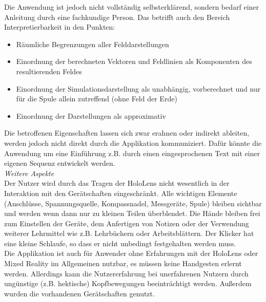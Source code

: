 Die Anwendung ist jedoch nicht vollständig selbsterklärend, sondern bedarf einer Anleitung durch eine fachkundige Person. Das betrifft auch den Bereich Interpretierbarkeit in den Punkten:
\begin{itemize}
	\setlength{\itemsep}{-1pt}
	\singlespacing
	\item Räumliche Begrenzungen aller Felddarstellungen
	\item Einordnung der berechneten Vektoren und Feldlinien als Komponenten des resultierenden Feldes
	\item Einordnung der Simulationsdarstellung als unabhängig, vorberechnet und nur für die Spule allein zutreffend (ohne Feld der Erde)
	\item Einordnung der Darstellungen als approximativ
\end{itemize}

Die betroffenen Eigenschaften lassen sich zwar erahnen oder indirekt ableiten, werden jedoch nicht direkt durch die Applikation kommuniziert. Dafür könnte die Anwendung um eine Einführung z.B. durch einen eingesprochenen Text mit einer eigenen Sequenz entwickelt werden.\\

\textit{Weitere Aspekte}\\
Der Nutzer wird durch das Tragen der HoloLens nicht wesentlich in der Interaktion mit den Gerätschaften eingeschränkt. Alle wichtigen Elemente (Anschlüsse, Spannungsquelle, Kompassnadel, Messgeräte, Spule) bleiben sichtbar und werden wenn dann nur zu kleinen Teilen überblendet. Die Hände bleiben frei zum Einstellen der Geräte, dem Anfertigen von Notizen oder der Verwendung weiterer Lehrmittel wie z.B. Lehrbüchern oder Arbeitsblättern. Der Klicker hat eine kleine Schlaufe, so dass er nicht unbedingt festgehalten werden muss.\\

Die Applikation ist auch für Anwender ohne Erfahrungen mit der HoloLens oder Mixed Reality im Allgemeinen nutzbar, es müssen keine Handgesten erlernt werden. Allerdings kann die Nutzererfahrung bei unerfahrenen Nutzern durch ungünstige (z.B. hektische) Kopfbewegungen beeinträchtigt werden. Außerdem wurden die vorhandenen Gerätschaften genutzt.\\

